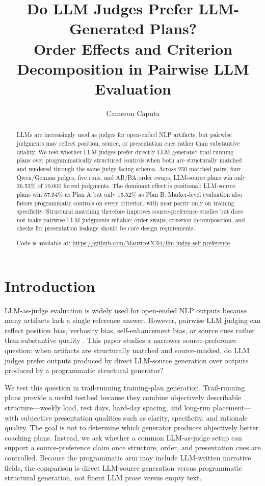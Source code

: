 \documentclass[11pt]{article}
\title{Do LLM Judges Prefer LLM-Generated Plans?\\
Order Effects and Criterion Decomposition in Pairwise LLM Evaluation}
\author{Cameron Caputa \\
}
\begin{document}
\maketitle

\begin{abstract}
LLMs are increasingly used as judges for open-ended NLP artifacts, but pairwise judgments may reflect position, source, or presentation cues rather than substantive quality. We test whether LLM judges prefer directly LLM-generated trail-running plans over programmatically structured controls when both are structurally matched and rendered through the same judge-facing schema. Across 250 matched pairs, four Qwen/Gemma judges, five runs, and AB/BA order swaps, LLM-source plans win only 36.53\% of 10,000 forced judgments. The dominant effect is positional: LLM-source plans win 57.54\% as Plan A but only 15.52\% as Plan B. Marker-level evaluation also favors programmatic controls on every criterion, with near parity only on training specificity. Structural matching therefore improves source-preference studies but does not make pairwise LLM judgments reliable; order swaps, criterion decomposition, and checks for presentation leakage should be core design requirements.

Code is available at: \url{https://github.com/MauriceCC04/llm-judge-self-preference}
\end{abstract}

\section{Introduction}

LLM-as-judge evaluation is widely used for open-ended NLP outputs because many artifacts lack a single reference answer. However, pairwise LLM judging can reflect position bias, verbosity bias, self-enhancement bias, or source cues rather than substantive quality \citep{zheng2023llmasajudge,gu2024language}. This paper studies a narrower source-preference question: when artifacts are structurally matched and source-masked, do LLM judges prefer outputs produced by direct LLM-source generation over outputs produced by a programmatic structural generator?

We test this question in trail-running training-plan generation. Trail-running plans provide a useful testbed because they combine objectively describable structure---weekly load, rest days, hard-day spacing, and long-run placement---with subjective presentation qualities such as clarity, specificity, and rationale quality. The goal is not to determine which generator produces objectively better coaching plans. Instead, we ask whether a common LLM-as-judge setup can support a source-preference claim once structure, order, and presentation cues are controlled. Because the programmatic arm may include LLM-written narrative fields, the comparison is direct LLM-source generation versus programmatic structural generation, not fluent LLM prose versus empty text.
\end{document}
